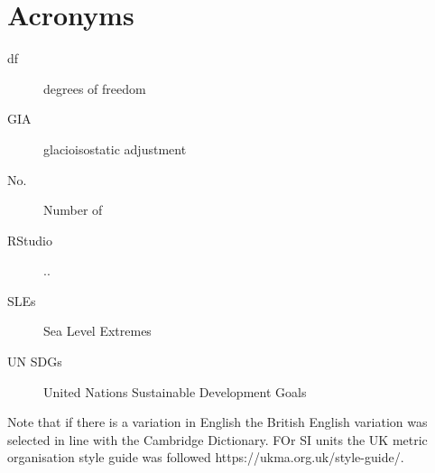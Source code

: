 
\chapter{Acronyms}
\begin{description}
\item[df]degrees of freedom
\item[GIA] glacioisostatic adjustment
\item[No.] Number of
\item [RStudio] ..
\item[SLEs] Sea Level Extremes
\item [UN SDGs] United Nations Sustainable Development Goals 
\end{description}

Note that if there is a variation in English the British English variation was selected in line with the Cambridge Dictionary. FOr SI units the UK metric organisation style guide was followed https://ukma.org.uk/style-guide/.  